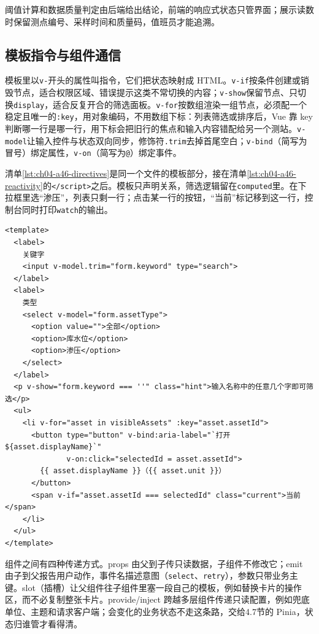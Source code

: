阈值计算和数据质量判定由后端给出结论，前端的响应式状态只管界面；展示读数时保留测点编号、采样时间和质量码，值班员才能追溯。

\subsection{模板指令与组件通信}

模板里以\texttt{v-}开头的属性叫指令，它们把状态映射成 HTML。\texttt{v-if}按条件创建或销毁节点，适合权限区域、错误提示这类不常切换的内容；\texttt{v-show}保留节点、只切换\texttt{display}，适合反复开合的筛选面板。\texttt{v-for}按数组渲染一组节点，必须配一个稳定且唯一的\texttt{:key}，用对象编码，不用数组下标：列表筛选或排序后，Vue 靠 key 判断哪一行是哪一行，用下标会把旧行的焦点和输入内容错配给另一个测站。\texttt{v-model}让输入控件与状态双向同步，修饰符\texttt{.trim}去掉首尾空白；\texttt{v-bind}（简写为冒号）绑定属性，\texttt{v-on}（简写为\texttt{@}）绑定事件。

清单\ref{lst:ch04-a46-directives}是同一个文件的模板部分，接在清单\ref{lst:ch04-a46-reactivity}的\texttt{</script>}之后。模板只声明关系，筛选逻辑留在\texttt{computed}里。在下拉框里选“渗压”，列表只剩一行；点击某一行的按钮，“当前”标记移到这一行，控制台同时打印\texttt{watch}的输出。

\begin{lstlisting}[label={lst:ch04-a46-directives},language=Vue,caption={AssetFilterPage.vue 的模板：指令与稳定 key}]
<template>
  <label>
    关键字
    <input v-model.trim="form.keyword" type="search">
  </label>
  <label>
    类型
    <select v-model="form.assetType">
      <option value="">全部</option>
      <option>库水位</option>
      <option>渗压</option>
    </select>
  </label>
  <p v-show="form.keyword === ''" class="hint">输入名称中的任意几个字即可筛选</p>
  <ul>
    <li v-for="asset in visibleAssets" :key="asset.assetId">
      <button type="button" v-bind:aria-label="`打开${asset.displayName}`"
              v-on:click="selectedId = asset.assetId">
        {{ asset.displayName }}（{{ asset.unit }}）
      </button>
      <span v-if="asset.assetId === selectedId" class="current">当前</span>
    </li>
  </ul>
</template>
\end{lstlisting}

组件之间有四种传递方式。props 由父到子传只读数据，子组件不修改它；emit 由子到父报告用户动作，事件名描述意图（\texttt{select}、\texttt{retry}），参数只带业务主键。slot（插槽）让父组件往子组件里塞一段自己的模板，例如替换卡片的操作区，而不必复制整张卡片。provide/inject 跨越多层组件传递只读配置，例如兜底单位、主题和请求客户端；会变化的业务状态不走这条路，交给4.7节的 Pinia，状态归谁管才看得清。


